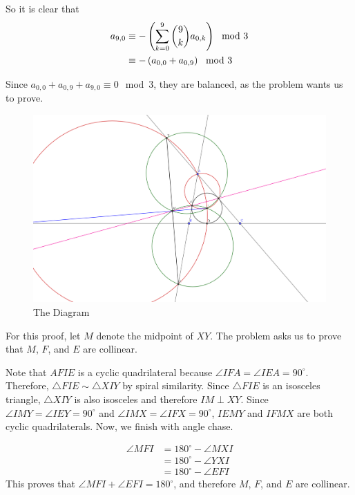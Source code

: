 \documentclass[10pt]{../usamts}
\begin{document}
\begin{solution}
So it is clear that
\begin{align*}
    a_{9,0} &\equiv -\left( \sum_{k=0}^{9} \binom{9}{k} a_{0,k} \right) \mod 3\\
    &\equiv -\left( a_{0,0} + a_{0,9} \right) \mod 3\\
\end{align*}

Since $a_{0,0} + a_{0,9} + a_{9,0} \equiv 0 \mod 3$, they are balanced, as the problem wants us to prove. \hfill \qedsymbol

\end{solution}


\begin{solution}
\begin{figure}
\includegraphics[width=16cm]{round2/p4diagram.png}
\caption{The Diagram}
\end{figure}

For this proof, let $M$ denote the midpoint of $XY$. The problem asks us to prove that $M$, $F$, and $E$ are collinear.

Note that $AFIE$ is a cyclic quadrilateral because $\angle IFA = \angle IEA = 90^\circ$. Therefore, $\triangle FIE \sim \triangle XIY$ by spiral similarity. Since $\triangle FIE$ is an isosceles triangle, $\triangle XIY$ is also isosceles and therefore $IM \perp XY$. Since $\angle IMY = \angle IEY = 90^\circ$ and $\angle IMX = \angle IFX = 90^\circ$, $IEMY$ and $IFMX$ are both cyclic quadrilaterals. Now, we finish with angle chase.

\begin{align*}
    \angle MFI &= 180^\circ - \angle MXI \tag{$IFMX$ is a cyclic quadrilateral} \\
    &= 180^\circ - \angle YXI \tag{$Y$, $M$, and $X$ are collinear in that order since $M$ is the midpoint of $XY$}\\
    &= 180^\circ - \angle EFI \tag{$\triangle FIE \sim \triangle XIY$ by spiral similarity}
\end{align*}
This proves that $\angle MFI + \angle EFI = 180^\circ$, and therefore $M$, $F$, and $E$ are collinear. \hfill \qedsymbol
\end{solution}
\end{document}
